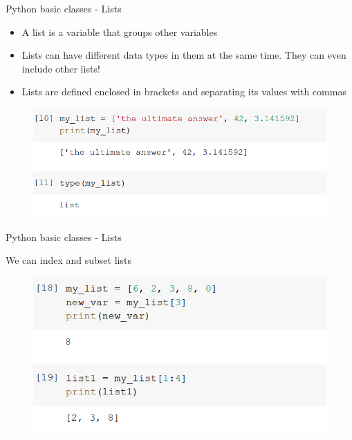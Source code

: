\documentclass[aspectratio=169]{beamer}
\begin{document}
\begin{frame}{Python basic classes - Lists}

	\begin{itemize}
		\item A list is a variable that groups other variables
		\item Lists can have different data types in them at the same time. They can even include other lists!
		\item Lists are defined enclosed in brackets and separating its values with commas
	\end{itemize}

	\begin{figure}
		\centering
		\includegraphics[width=0.8\linewidth]{img/list_type.png}
	\end{figure}

\end{frame}

\begin{frame}{Python basic classes - Lists}

	We can index and subset lists

	\begin{figure}
		\centering
		\includegraphics[width=0.6\linewidth]{img/list_subset.png}
	\end{figure}

\end{frame}
\end{document}
